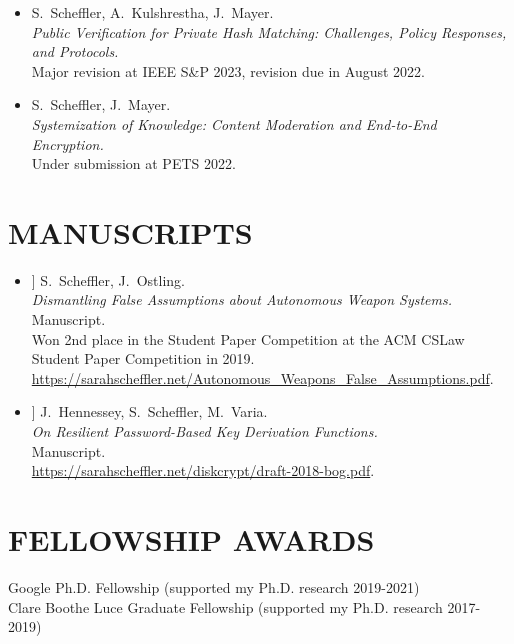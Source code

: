 \documentclass{res}
\begin{document}
\begin{resume}
\begin{itemize}
\item[\csamimprovements] S.~Scheffler, A.~Kulshrestha, J.~Mayer. \\
\emph{Public Verification for Private Hash Matching: Challenges, Policy Responses, and Protocols.} \\
Major revision at IEEE S\&P 2023, revision due in August 2022.

\item[\eeesok] S.~Scheffler, J.~Mayer. \\
\emph{Systemization of Knowledge: Content Moderation and End-to-End Encryption.} \\
Under submission at PETS 2022.

\end{itemize}

\vspace{0.25in}

\section{MANUSCRIPTS}
\vspace{0.25in}

\newcommand{\autonomousWeapons}{[15]\xspace}
\newcommand{\bog}{[16]\xspace}

\begin{itemize}
\item[\autonomousWeapons] S.~Scheffler, J.~Ostling. \\
\emph{Dismantling False Assumptions about Autonomous Weapon Systems.} \\
Manuscript.  \\
Won 2nd place in the Student Paper Competition at the ACM CSLaw Student Paper Competition in 2019. \\
\url{https://sarahscheffler.net/Autonomous_Weapons_False_Assumptions.pdf}.

\item[\bog] J.~Hennessey, S.~Scheffler, M.~Varia. \\
\emph{On Resilient Password-Based Key Derivation Functions.} \\
Manuscript.  \\
\url{https://sarahscheffler.net/diskcrypt/draft-2018-bog.pdf}.
\end{itemize}

\vspace{0.25in}

\section{FELLOWSHIP AWARDS}
\vspace{0.1in}
    Google Ph.D. Fellowship (supported my Ph.D. research 2019-2021) \\
    Clare Boothe Luce Graduate Fellowship (supported my Ph.D. research 2017-2019) \\


\end{resume}
\end{document}
